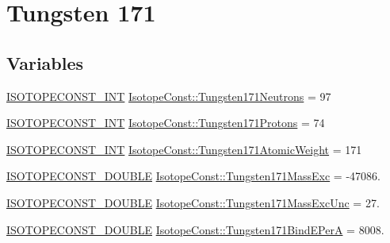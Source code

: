 \hypertarget{group___isotope_const-_tungsten-_w171}{}\section{Tungsten 171}
\label{group___isotope_const-_tungsten-_w171}
\subsection*{Variables}
\begin{DoxyCompactItemize}
\item 
\mbox{\hyperlink{group___isotope_const-_macros_ga5f18360b3e99483a35c32d789e62621c}{I\+S\+O\+T\+O\+P\+E\+C\+O\+N\+S\+T\+\_\+\+I\+NT}} \mbox{\hyperlink{group___isotope_const-_tungsten-_w171_ga6bd09a8cb3516ccd50f0a9b282f390c0}{Isotope\+Const\+::\+Tungsten171\+Neutrons}} = 97
\item 
\mbox{\hyperlink{group___isotope_const-_macros_ga5f18360b3e99483a35c32d789e62621c}{I\+S\+O\+T\+O\+P\+E\+C\+O\+N\+S\+T\+\_\+\+I\+NT}} \mbox{\hyperlink{group___isotope_const-_tungsten-_w171_gadb2f0d9260d0e4e30bef461fe55a0ab6}{Isotope\+Const\+::\+Tungsten171\+Protons}} = 74
\item 
\mbox{\hyperlink{group___isotope_const-_macros_ga5f18360b3e99483a35c32d789e62621c}{I\+S\+O\+T\+O\+P\+E\+C\+O\+N\+S\+T\+\_\+\+I\+NT}} \mbox{\hyperlink{group___isotope_const-_tungsten-_w171_gaf31bdd2774c1c53a4bdec97baab9fa7f}{Isotope\+Const\+::\+Tungsten171\+Atomic\+Weight}} = 171
\item 
\mbox{\hyperlink{group___isotope_const-_macros_ga8f45a7272ce02c0b4c65c44636ed719a}{I\+S\+O\+T\+O\+P\+E\+C\+O\+N\+S\+T\+\_\+\+D\+O\+U\+B\+LE}} \mbox{\hyperlink{group___isotope_const-_tungsten-_w171_ga00f249c74aff02ea33c432641be4f6f5}{Isotope\+Const\+::\+Tungsten171\+Mass\+Exc}} = -\/47086.
\item 
\mbox{\hyperlink{group___isotope_const-_macros_ga8f45a7272ce02c0b4c65c44636ed719a}{I\+S\+O\+T\+O\+P\+E\+C\+O\+N\+S\+T\+\_\+\+D\+O\+U\+B\+LE}} \mbox{\hyperlink{group___isotope_const-_tungsten-_w171_gaa659066720874fe5d94441bc295d83e4}{Isotope\+Const\+::\+Tungsten171\+Mass\+Exc\+Unc}} = 27.
\item 
\mbox{\hyperlink{group___isotope_const-_macros_ga8f45a7272ce02c0b4c65c44636ed719a}{I\+S\+O\+T\+O\+P\+E\+C\+O\+N\+S\+T\+\_\+\+D\+O\+U\+B\+LE}} \mbox{\hyperlink{group___isotope_const-_tungsten-_w171_gad38c4b751229a98d94d652c752e63cdf}{Isotope\+Const\+::\+Tungsten171\+Bind\+E\+PerA}} = 8008.
\item 

\end{DoxyCompactItemize}
